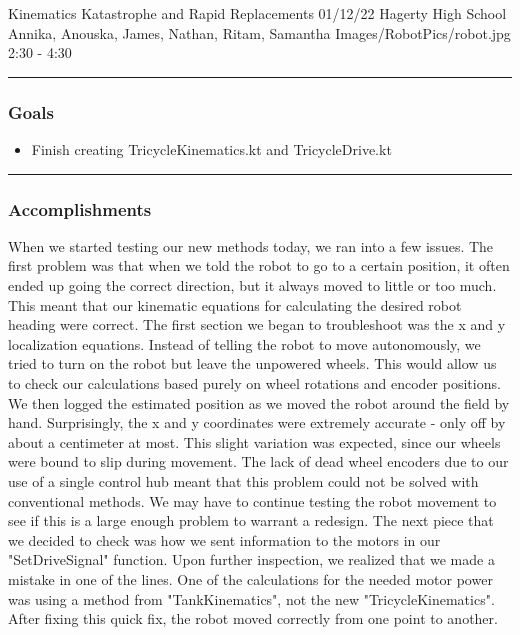 \insertmeeting 
	{Kinematics Katastrophe and Rapid Replacements} 
	{01/12/22} 
	{Hagerty High School}
	{Annika, Anouska, James, Nathan, Ritam, Samantha}
	{Images/RobotPics/robot.jpg}
	{2:30 - 4:30}
	
\noindent\hfil\rule{\textwidth}{.4pt}\hfil
\subsubsection*{Goals}
\begin{itemize}
    \item Finish creating TricycleKinematics.kt and TricycleDrive.kt  

\end{itemize} 

\noindent\hfil\rule{\textwidth}{.4pt}\hfil

\subsubsection*{Accomplishments}
When we started testing our new methods today, we ran into a few issues. The first problem was that when we told the robot to go to a certain position, it often ended up going the correct direction, but it always moved to little or too much. This meant that our kinematic equations for calculating the desired robot heading were correct. The first section we began to troubleshoot was the x and y localization equations. Instead of telling the robot to move autonomously, we tried to turn on the robot but leave the unpowered wheels. This would allow us to check our calculations based purely on wheel rotations and encoder positions. We then logged the estimated position as we moved the robot around the field by hand. Surprisingly, the x and y coordinates were extremely accurate - only off by about a centimeter at most. This slight variation was expected, since our wheels were bound to slip during movement. The lack of dead wheel encoders due to our use of a single control hub meant that this problem could not be solved with conventional methods. We may have to continue testing the robot movement to see if this is a large enough problem to warrant a redesign. The next piece that we decided to check was how we sent information to the motors in our "SetDriveSignal" function. Upon further inspection, we realized that we made a mistake in one of the lines. One of the calculations for the needed motor power was using a method from "TankKinematics", not the new "TricycleKinematics". After fixing this quick fix, the robot moved correctly from one point to another. 

